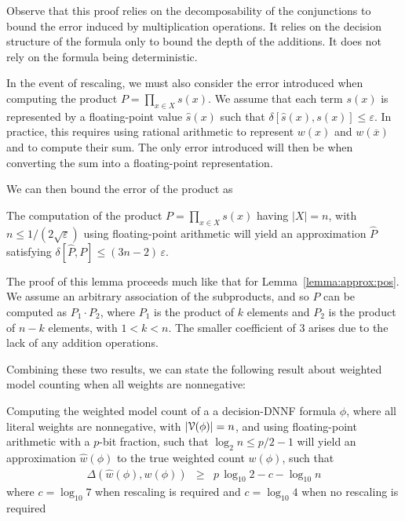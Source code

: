 \documentclass[letterpaper,USenglish,cleveref, autoref, thm-restate]{lipics-v2021}
\newcommand{\obar}[1]{\overline{#1}}
\newcommand{\approximate}[1]{\hat{#1}}
\newcommand{\approxP}{\approximate{P}}
\newcommand{\approxw}{\approximate{w}}
\newcommand{\approxs}{\approximate{s}}
\newcommand{\aerror}{\delta}
\newcommand{\digitprecision}{\Delta}
\newcommand{\roundepsilon}{\varepsilon}
\newcommand{\varset}{X}
\newcommand{\dependencyset}{{\cal V}}
\begin{document}
Observe that this proof relies on the decomposability of the
conjunctions to bound the error induced by multiplication operations.
It relies on the decision structure of the formula only to bound the
depth of the additions.  It does not rely on the formula being deterministic.

In the event of rescaling, we must also consider the error introduced
when computing the product $P = \prod_{x\in\varset} s(x)$.  We assume that
each term $s(x)$ is represented by a floating-point value
$\approxs(x)$ such that $\aerror[\approxs(x), s(x)] \leq
\roundepsilon$.  In practice, this requires using rational arithmetic
to represent $w(x)$ and $w(\obar{x})$ and to compute their sum.  The
only error introduced will then be when converting the sum into
a floating-point representation.

We can then bound the error of the product as
\begin{lemma}
  The computation of the product $P = \prod_{x\in\varset} s(x)$ having
$|\varset| = n$, with $n \leq 1/(2\sqrt{\roundepsilon})$ using floating-point arithmetic will yield an approximation $\approxP$ satisfying
  $\aerror[\approxP, P] \leq (3n-2)\,\roundepsilon$.
  \label{lemma:approx:product}
\end{lemma}

The proof of this lemma proceeds much like that for Lemma~\ref{lemma:approx:pos}.  We assume an arbitrary association of the subproducts, and so $P$ can be computed as
$P_1 \cdot P_2$, where $P_1$ is the product of $k$ elements and $P_2$ is the product of $n-k$ elements, with $1 < k < n$.
The smaller coefficient of $3$ arises due to the lack of any addition operations.

Combining these two results, we can state the following result about weighted model counting when all weights are nonnegative:
\begin{theorem}
  \label{thm:approx:pos}
Computing the weighted model count of a
a decision-DNNF formula $\phi$, where all literal weights are nonnegative, with $|\dependencyset(\phi)| = n$, and using floating-point arithmetic with a $p$-bit fraction, such that $\log_2 n \leq p/2-1$
will yield an approximation $\approxw(\phi)$ to the true weighted count $w(\phi)$, such that
\begin{eqnarray}
\digitprecision(\approxw(\phi), w(\phi)) & \geq & p\,\log_{10} 2 - c - \log_{10} n \label{eqn:precision:wmc}
\end{eqnarray}
where $c = \log_{10} 7$ when rescaling is required and $c = \log_{10} 4$ when no rescaling is required
\end{theorem}
\end{document}
